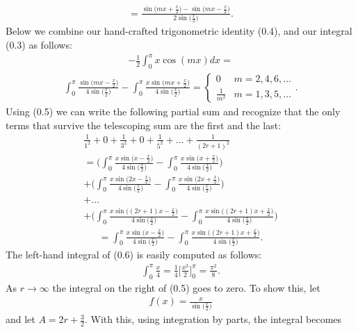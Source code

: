 \documentclass[12pt,oneside]{amsart}
\theoremstyle{definition}
\theoremstyle{remark}
\numberwithin{equation}{exer}
\newcommand{\sxx}{\sin{\big(\frac{x}{2}\big)}}
\begin{document}
\begin{align}
    =\frac{\sin{\big(mx + \frac{x}{2}\big)}-\sin{\big(mx-\frac{x}{2}\big)}}{2\sxx} .
\end{align}
\newline
Below we combine our hand-crafted trigonometric identity (0.4), and our integral (0.3) as follows:
\begin{align*}
     -\frac{1}{2} \int_0^\pi x\cos{(mx)}dx=
\end{align*}     
\begin{align}
     \int_0^\pi \frac{\sin{\big(mx-\frac{x}{2}\big)}}{4\sxx}
     -\int_0^\pi\frac{x\sin{\big(mx + \frac{x}{2}\big)}}{4\sxx}
        = \begin{cases}
               0               & m=2,4,6,\dots\\
               \frac{1}{m^2}              & m= 1,3,5, \dots
           \end{cases}.
\end{align}
Using (0.5) we can write the following partial sum and recognize that the only terms that survive the telescoping sum are the first and the last:
\begin{align*}
    \frac{1}{1^2} + 0 + \frac{1}{3^2} + 0 + \frac{1}{5^2}+...+\frac{1}{(2r+1)^2} \\
       =\Bigg(\int_0^\pi \frac{x\sin{\big(x-\frac{x}{2}\big)}}{4\sxx}
     -\int_0^\pi\frac{x\sin{\big(x + \frac{x}{2}\big)}}{4\sxx} \Bigg)\\+
     \Bigg(\int_0^\pi \frac{x\sin{\big(2x-\frac{x}{2}\big)}}{4\sxx}
     -\int_0^\pi\frac{x\sin{\big(2x + \frac{x}{2}\big)}}{4\sxx} \Bigg)\\
     +\dots\\
     +     \Bigg(\int_0^\pi \frac{x\sin{\big((2r+1)x-\frac{x}{2}\big)}}{4\sxx}
     -\int_0^\pi\frac{x\sin{\big((2r+1)x + \frac{x}{2}\big)}}{4\sxx} \Bigg)
\end{align*}
\begin{align}
        =\int_0^\pi \frac{x\sin{\big(x-\frac{x}{2}\big)}}{4\sxx}-\int_0^\pi\frac{x\sin{\big((2r+1)x + \frac{x}{2}\big)}}{4\sxx}.
\end{align}
\indent
The left-hand integral of (0.6) is easily computed as follows:
\begin{align*}
    \int_0^\pi \frac{x}{4} = \frac{1}{4} \Bigg[\frac{x^2}{2}\Bigg]_0^\pi = \frac{\pi^2}{8}.
\end{align*}
As $r \to \infty$ the integral on the right of (0.5) goes to zero. To show this, let
\begin{align*}
    f(x)=\frac{x}{\sxx}
\end{align*}
and let $A=2r+\frac{3}{2}$. With this, using integration by parts, the integral becomes 
\end{document}
